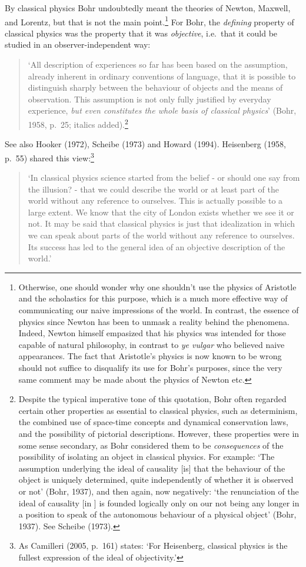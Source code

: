 \documentclass[12pt]{article}
\begin{document}
 By classical physics Bohr undoubtedly meant the theories of Newton, Maxwell, and Lorentz, but that is not the main point.\footnote{Otherwise, one should wonder why one shouldn't use the physics of Aristotle and the scholastics for this purpose, which is a much more effective way of communicating  our naive impressions of the world. In contrast, the essence of physics since Newton has been to unmask a reality behind the phenomena. Indeed, Newton himself empasized that his physics was intended for those capable of natural philosophy, in contrast to  \textit{ye vulgar} who believed naive appearances.   The fact that Aristotle's physics is now known to be wrong should not suffice to disqualify its use for Bohr's purposes, since the very same comment may be made about the physics of Newton etc.} For Bohr, the \textit{defining} property of classical physics was the property that it was \textit{objective}, i.e.\ that it could be studied in an observer-independent way:
 \begin{quote}
`All description of experiences so far has been based on the assumption, already inherent in ordinary conventions of language, that it is possible to distinguish sharply between the behaviour of objects and the means of observation. This assumption is not only fully justified by everyday experience, {\it but even constitutes the whole basis of classical physics}'
(Bohr, 1958, p.\ 25; italics added).\footnote{Despite the typical imperative tone of this quotation, Bohr often regarded certain other properties as essential to classical physics, such as  determinism, the combined use of space-time concepts and dynamical conservation laws, and the possibility of pictorial descriptions. However, these properties were in some sense secondary,  as Bohr considered them to be  {\it consequences} of the possibility of isolating an object in classical physics. For example: `The assumption underlying the ideal of causality [is] that the behaviour of the object is uniquely determined, quite independently of whether it is observed or not' (Bohr, 1937), and then again, now negatively: `the renunciation of the ideal of causality [in \qm] is founded logically only on our not being any longer in a position to speak of the autonomous behaviour of a physical object' (Bohr, 1937).
See Scheibe (1973).} \end{quote}
 See also Hooker (1972), Scheibe (1973) and Howard (1994). Heisenberg (1958, p.\ 55)
shared this view:\footnote{As Camilleri (2005, p.\ 161) states: `For Heisenberg,
classical physics is the fullest expression of the ideal of objectivity.'}
 \begin{quote}
 `In classical physics science started from the belief - or should one say from the illusion? - that we could describe the world or at least part of the world without any reference to ourselves. This is actually possible to a large extent. We know that the city of London exists whether we see it or not. It may be said that classical physics is just that idealization in which we can speak about parts of the world without any reference to ourselves. Its success has led to the general idea of an objective description of the world.' \end{quote}
 
\end{document}
